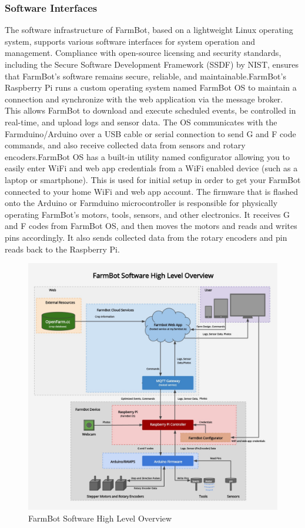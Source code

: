 \subsubsection{Software Interfaces}
The software infrastructure of FarmBot, based on a lightweight Linux operating system, supports various software interfaces for system operation and management. Compliance with open-source licensing and security standards, including the Secure Software Development Framework (SSDF) by NIST, ensures that FarmBot's software remains secure, reliable, and maintainable.FarmBot’s Raspberry Pi runs a custom operating system named FarmBot OS to maintain a connection and synchronize with the web application via the message broker. This allows FarmBot to download and execute scheduled events, be controlled in real-time, and upload logs and sensor data. The OS communicates with the Farmduino/Arduino over a USB cable or serial connection to send G and F code commands, and also receive collected data from sensors and rotary encoders.FarmBot OS has a built-in utility named configurator allowing you to easily enter WiFi and web app credentials from a WiFi enabled device (such as a laptop or smartphone). This is used for initial setup in order to get your FarmBot connected to your home WiFi and web app account.
The firmware that is flashed onto the Arduino or Farmduino microcontroller is responsible for physically operating FarmBot’s motors, tools, sensors, and other electronics. It receives G and F codes from FarmBot OS, and then moves the motors and reads and writes pins accordingly. It also sends collected data from the rotary encoders and pin reads back to the Raspberry Pi.\cite{farmbot2024intro}

\begin{figure}[H]
    \centering
\includegraphics[scale=0.3]{./Figures/farmbot_software_high_level_overview.jpg}
\caption{FarmBot Software High Level Overview}
\end{figure}


